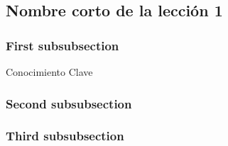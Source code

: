 \subsection{Nombre corto de la lección 1}


\begin{opening}\blindtext\end{opening}
\subsubsection{First subsubsection}
\Blindtext
\begin{important}[0.45\textwidth]{Conocimiento Clave}
    \blindtext
\end{important}
\Blindtext
\subsubsection{Second subsubsection}
\Blindtext
\subsubsection{Third subsubsection}
\Blindtext
\begin{closing}
    \blindtext
\end{closing}

\begin{problemas}
    \Blindenumerate[2]
\end{problemas}